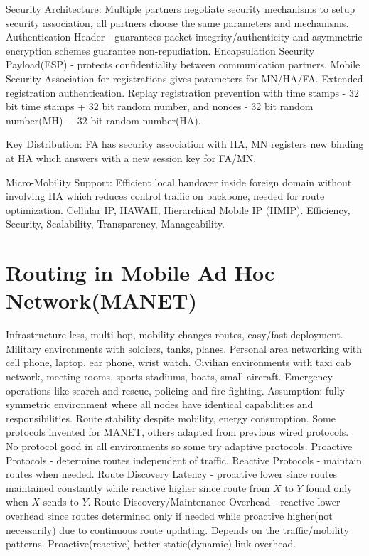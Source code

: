 \documentclass[9pt]{extarticle}
\begin{document}
\begin{multicols}{2}
Security Architecture: Multiple partners negotiate security mechanisms to setup security association, all partners choose the same parameters and mechanisms. Authentication-Header - guarantees packet integrity/authenticity and asymmetric encryption schemes guarantee non-repudiation. Encapsulation Security Payload(ESP) - protects confidentiality between communication partners. Mobile Security Association for registrations gives parameters for MN/HA/FA. Extended registration authentication. Replay registration prevention with  time stamps - 32 bit time stamps + 32 bit random number, and nonces - 32 bit random number(MH) + 32 bit random number(HA).

Key Distribution: FA has security association with HA, MN registers new binding at HA which answers with a new session key for FA/MN. 

Micro-Mobility Support: Efficient local handover inside foreign domain without involving HA which reduces control traffic on backbone, needed for route optimization. Cellular IP, HAWAII, Hierarchical Mobile IP (HMIP). Efficiency, Security, Scalability, Transparency, Manageability.

\section{Routing in Mobile Ad Hoc Network(MANET)}

Infrastructure-less, multi-hop, mobility changes routes, easy/fast deployment. Military environments with soldiers, tanks, planes. Personal area networking with cell phone, laptop, ear phone, wrist watch. Civilian environments with taxi cab network, meeting rooms, sports stadiums, boats, small aircraft. Emergency operations like search-and-rescue, policing and fire fighting. Assumption: fully symmetric environment where all nodes have identical capabilities and responsibilities. Route stability despite mobility, energy consumption. Some protocols invented for MANET, others adapted from previous wired protocols. No protocol good in all environments so some try adaptive protocols. Proactive Protocols - determine routes independent of traffic. Reactive Protocols - maintain routes when needed. Route Discovery Latency - proactive lower since routes maintained constantly while reactive higher since route from $X$ to $Y$ found only when $X$ sends to $Y$. Route Discovery/Maintenance Overhead - reactive lower overhead since routes determined only if needed while proactive higher(not necessarily) due to continuous route updating. Depends on the traffic/mobility patterns. Proactive(reactive) better static(dynamic) link overhead.


\end{multicols}
\end{document}

